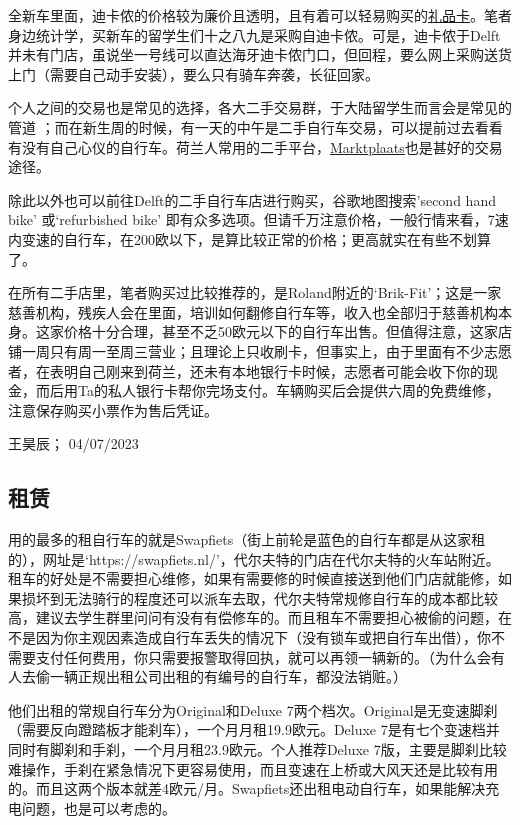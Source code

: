 全新车里面，迪卡侬的价格较为廉价且透明，且有着可以轻易购买的\hyperlink{礼品卡}{\uline{礼品卡}}。笔者身边统计学，买新车的留学生们十之八九是采购自迪卡侬。可是，迪卡侬于Delft并未有门店，虽说坐一号线可以直达海牙迪卡侬门口，但回程，要么网上采购送货上门（需要自己动手安装），要么只有骑车奔袭，长征回家。

个人之间的交易也是常见的选择，各大二手交易群，于大陆留学生而言会是常见的管道 ；而在新生周的时候，有一天的中午是二手自行车交易，可以提前过去看看有没有自己心仪的自行车。荷兰人常用的二手平台，\href{https://www.marktplaats.nl/}{\uline{Marktplaats}}也是甚好的交易途径。

除此以外也可以前往Delft的二手自行车店进行购买，谷歌地图搜索'second hand bike' 或‘refurbished bike’ 即有众多选项。但请千万注意价格，一般行情来看，7速内变速的自行车，在200欧以下，是算比较正常的价格；更高就实在有些不划算了。

在所有二手店里，笔者购买过比较推荐的，是Roland附近的‘Brik-Fit’；这是一家慈善机构，残疾人会在里面，培训如何翻修自行车等，收入也全部归于慈善机构本身。这家价格十分合理，甚至不乏50欧元以下的自行车出售。但值得注意，这家店铺一周只有周一至周三营业；且理论上只收刷卡，但事实上，由于里面有不少志愿者，在表明自己刚来到荷兰，还未有本地银行卡时候，志愿者可能会收下你的现金，而后用Ta的私人银行卡帮你完场支付。车辆购买后会提供六周的免费维修，注意保存购买小票作为售后凭证。
\begin{flushright}
王昊辰； 04/07/2023
\end{flushright}

\subsection{租赁}
用的最多的租自行车的就是Swapfiets（街上前轮是蓝色的自行车都是从这家租的），网址是‘https://swapfiets.nl/’，代尔夫特的门店在代尔夫特的火车站附近。租车的好处是不需要担心维修，如果有需要修的时候直接送到他们门店就能修，如果损坏到无法骑行的程度还可以派车去取，代尔夫特常规修自行车的成本都比较高，建议去学生群里问问有没有有偿修车的。而且租车不需要担心被偷的问题，在不是因为你主观因素造成自行车丢失的情况下（没有锁车或把自行车出借），你不需要支付任何费用，你只需要报警取得回执，就可以再领一辆新的。（为什么会有人去偷一辆正规出租公司出租的有编号的自行车，都没法销赃。）

他们出租的常规自行车分为Original和Deluxe 7两个档次。Original是无变速脚刹（需要反向蹬踏板才能刹车），一个月月租19.9欧元。Deluxe 7是有七个变速档并同时有脚刹和手刹，一个月月租23.9欧元。个人推荐Deluxe 7版，主要是脚刹比较难操作，手刹在紧急情况下更容易使用，而且变速在上桥或大风天还是比较有用的。而且这两个版本就差4欧元/月。Swapfiets还出租电动自行车，如果能解决充电问题，也是可以考虑的。


